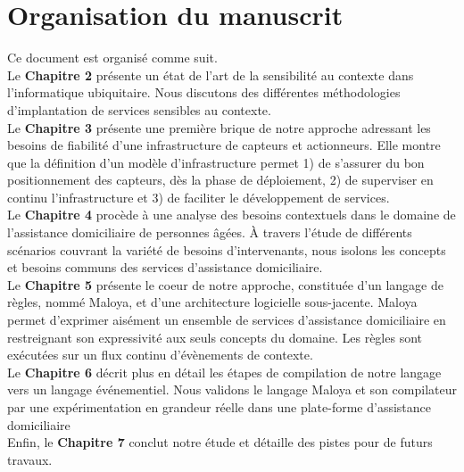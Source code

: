 \section{Organisation du manuscrit}
Ce document est organisé comme suit.\\

Le {\bf Chapitre 2} présente un état de l'art de la sensibilité au contexte dans l'informatique ubiquitaire. Nous discutons des différentes méthodologies d'implantation de services sensibles au contexte.\\

Le {\bf Chapitre 3} présente une première brique de notre approche adressant les besoins de fiabilité d'une infrastructure de capteurs et actionneurs. Elle montre que la définition d'un modèle d'infrastructure permet 1) de s'assurer du bon positionnement des capteurs, dès la phase de déploiement, 2) de superviser en continu l'infrastructure et 3) de faciliter le développement de services.\\

Le {\bf Chapitre 4} procède à une analyse des besoins contextuels dans le domaine de l'assistance domiciliaire de personnes âgées. À travers l'étude de différents scénarios couvrant la variété de besoins d'intervenants, nous isolons les concepts et besoins communs des services d'assistance domiciliaire.\\

Le {\bf Chapitre 5} présente le coeur de notre approche, constituée d'un langage de règles, nommé Maloya, et d'une architecture logicielle sous-jacente. Maloya permet d'exprimer aisément un ensemble de services d'assistance domiciliaire en restreignant son expressivité aux seuls concepts du domaine. Les règles sont exécutées sur un flux continu d'évènements de contexte.\\

Le {\bf Chapitre 6} décrit plus en détail les étapes de compilation de notre langage vers un langage événementiel. Nous validons le langage Maloya et son compilateur par une expérimentation en grandeur réelle dans une plate-forme d'assistance domiciliaire\\

Enfin, le {\bf Chapitre 7} conclut notre étude et détaille des pistes pour de futurs travaux.
